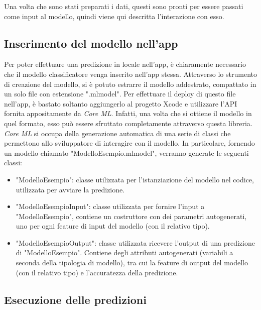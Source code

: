Una volta che sono stati preparati i dati, questi sono pronti per essere passati
come input al modello, quindi viene qui descritta l'interazione con esso.

\subsection{Inserimento del modello nell'app}

Per poter effettuare una predizione in locale nell'app, è chiaramente necessario che 
il modello classificatore venga inserito nell'app stessa. Attraverso lo strumento di 
creazione del modello, si è potuto estrarre il modello addestrato, compattato in un 
solo file con estensione ".mlmodel". Per effettuare il deploy di questo file nell'app,
è bastato soltanto aggiungerlo al progetto Xcode e utilizzare l'API fornita 
appositamente da \emph{Core ML}. Infatti, una volta che si ottiene il modello in quel
formato, esso può essere sfruttato completamente attraverso questa libreria.
\emph{Core ML} si occupa della generazione automatica di una serie di classi che 
permettono allo sviluppatore di interagire con il modello. In particolare, fornendo
un modello chiamato "ModelloEsempio.mlmodel", verranno generate le seguenti classi:
\begin{itemize}
    \item "ModelloEsempio": classe utilizzata per l'istanziazione del modello nel
    codice, utilizzata per avviare la predizione.
    \item "ModelloEsempioInput": classe utilizzata per fornire l'input a "ModelloEsempio",
    contiene un costruttore con dei parametri autogenerati, uno per ogni feature di
    input del modello (con il relativo tipo).
    \item "ModelloEsempioOutput":  classe utilizzata ricevere l'output di una predizione
    di "ModelloEsempio". Contiene degli attributi autogenerati (variabili a seconda della
    tipologia di modello), tra cui la feature di output del modello (con il relativo tipo)
    e l'accuratezza della predizione.
\end{itemize}

\subsection{Esecuzione delle predizioni}

